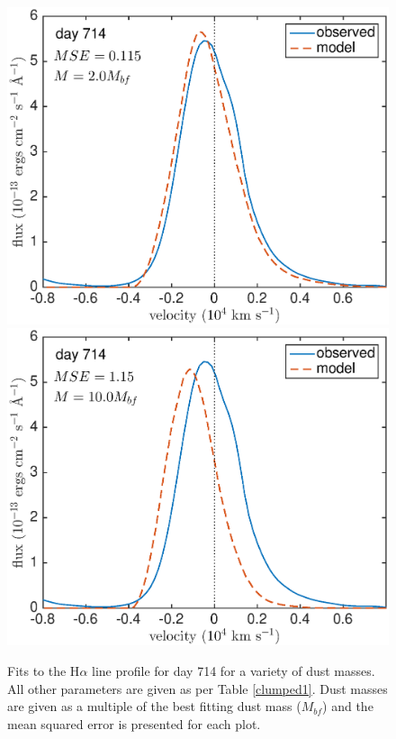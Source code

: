\begin{figure}
\includegraphics[clip = true, scale=0.43, trim=20 0 40 0]{chapters/chapter5/images/MSE/d714_M/d714_M2}
\includegraphics[clip = true, scale=0.43, trim=52 0 40 0]{chapters/chapter5/images/MSE/d714_M/d714_M10}
\caption{Fits to the H$\alpha$ line profile for day 714 for a variety of dust masses.  All other parameters are given as per Table \ref{clumped1}. Dust masses are given as a multiple of the best fitting dust mass ($M_{bf}$) and the mean squared error is presented for each plot.}
\label{fig:MSE1}
\end{figure}

